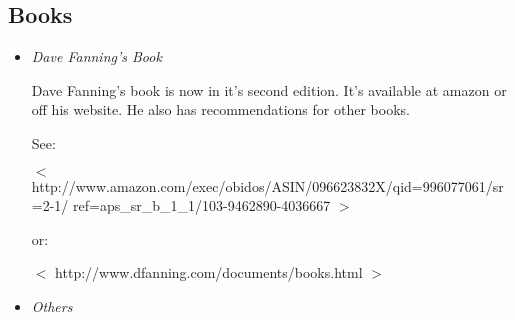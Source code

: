 \subsection{Books}\label{sec:qs-books}
  
\begin{itemize}
  \item \textit{Dave Fanning's Book}

  Dave Fanning's book is now in it's second edition. It's available at
  amazon or off his website. He also has recommendations for other
  books.

  See:

  $<$ http://www.amazon.com/exec/obidos/ASIN/096623832X/qid=996077061/sr=2-1/\BS
  ref=aps\_sr\_b\_1\_1/103-9462890-4036667 $>$

  or:

   $<$ http://www.dfanning.com/documents/books.html $>$

  \item \textit{Others}

\end{itemize}

